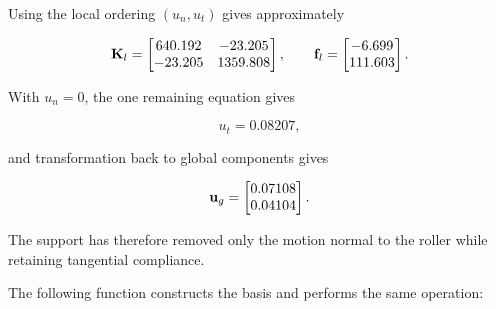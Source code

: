 Using the local ordering $(u_n,u_t)$ gives approximately

\begin{equation}
    \mathbf{K}_l
    =
    \begin{bmatrix}
        640.192&-23.205\\
        -23.205&1359.808
    \end{bmatrix},
    \qquad
    \mathbf{f}_l
    =
    \begin{bmatrix}
        -6.699\\111.603
    \end{bmatrix}.
\end{equation}

With $u_n=0$, the one remaining equation gives

\begin{equation}
    u_t=0.08207,
\end{equation}

and transformation back to global components gives

\begin{equation}
    \mathbf{u}_g
    =
    \begin{bmatrix}
        0.07108\\0.04104
    \end{bmatrix}.
\end{equation}

The support has therefore removed only the motion normal to the roller while
retaining tangential compliance.

The following function constructs the basis and performs the same operation:


